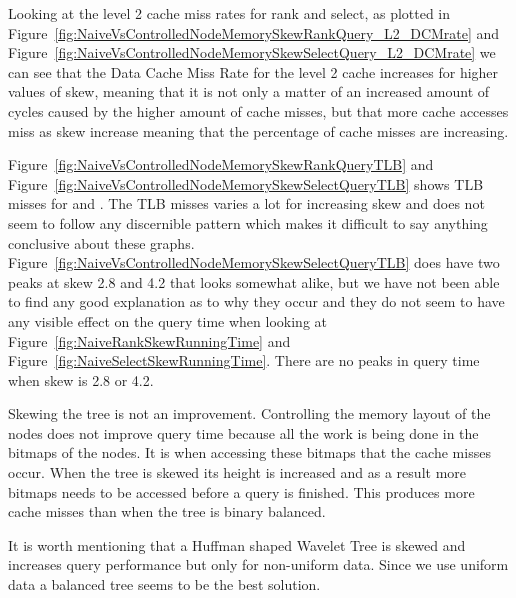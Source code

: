 Looking at the level 2 cache miss rates for rank and select, as plotted in Figure~\ref{fig:NaiveVsControlledNodeMemorySkewRankQuery_L2_DCMrate} and Figure~\ref{fig:NaiveVsControlledNodeMemorySkewSelectQuery_L2_DCMrate} we can see that the Data Cache Miss Rate for the level 2 cache increases for higher values of skew, meaning that it is not only a matter of an increased amount of cycles caused by the higher amount of cache misses, but that more cache accesses miss as skew increase meaning that the percentage of cache misses are increasing.

Figure~\ref{fig:NaiveVsControlledNodeMemorySkewRankQueryTLB} and Figure~\ref{fig:NaiveVsControlledNodeMemorySkewSelectQueryTLB} shows TLB misses for  and . 
The TLB misses varies a lot for increasing skew and does not seem to follow any discernible pattern which makes it difficult to say anything conclusive about these graphs. 
Figure~\ref{fig:NaiveVsControlledNodeMemorySkewSelectQueryTLB} does have two peaks at skew 2.8 and 4.2 that looks somewhat alike, but we have not been able to find any good explanation as to why they occur and they do not seem to have any visible effect on the query time when looking at Figure~\ref{fig:NaiveRankSkewRunningTime} and Figure~\ref{fig:NaiveSelectSkewRunningTime}.
There are no peaks in query time when skew is 2.8 or 4.2.

Skewing the tree is not an improvement. 
Controlling the memory layout of the nodes does not improve query time because all the work is being done in the bitmaps of the nodes.
It is when accessing these bitmaps that the cache misses occur.
When the tree is skewed its height is increased and as a result more bitmaps needs to be accessed before a query is finished. 
This produces more cache misses than when the tree is binary balanced.

It is worth mentioning that a Huffman shaped Wavelet Tree is skewed and increases query performance but only for non-uniform data.
Since we use uniform data a balanced tree seems to be the best solution.




